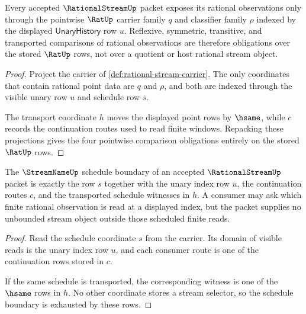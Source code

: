 \begin{theorem}
\label{thm:rational-stream-pointwise-rat-obligations}
Every accepted $\RationalStreamUp$ packet exposes its rational observations
only through the pointwise $\RatUp$ carrier family $q$ and classifier family
$\rho$ indexed by the displayed $\mathsf{UnaryHistory}$ row $u$. Reflexive,
symmetric, transitive, and transported comparisons of rational observations
are therefore obligations over the stored $\RatUp$ rows, not over a quotient
or host rational stream object.
\end{theorem}
\begin{proof}
Project the carrier of \autoref{def:rational-stream-carrier}. The only
coordinates that contain rational point data are $q$ and $\rho$, and both are
indexed through the visible unary row $u$ and schedule row $s$.

The transport coordinate $h$ moves the displayed point rows by $\hsame$, while
$c$ records the continuation routes used to read finite windows. Repacking
these projections gives the four pointwise comparison obligations entirely on
the stored $\RatUp$ rows.
\end{proof}

\begin{theorem}
\label{thm:rational-stream-streamname-schedule-boundary}
The $\StreamNameUp$ schedule boundary of an accepted $\RationalStreamUp$
packet is exactly the row $s$ together with the unary index row $u$, the
continuation routes $c$, and the transported schedule witnesses in $h$. A
consumer may ask which finite rational observation is read at a displayed
index, but the packet supplies no unbounded stream object outside those
scheduled finite reads.
\end{theorem}
\begin{proof}
Read the schedule coordinate $s$ from the carrier. Its domain of visible reads
is the unary index row $u$, and each consumer route is one of the continuation
rows stored in $c$.

If the same schedule is transported, the corresponding witness is one of the
$\hsame$ rows in $h$. No other coordinate stores a stream selector, so the
schedule boundary is exhausted by these rows.
\end{proof}

